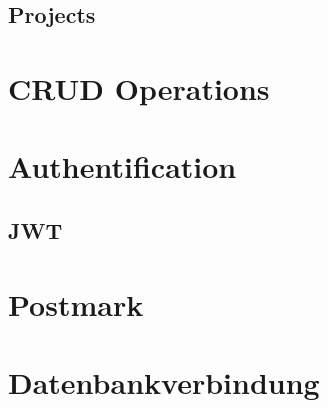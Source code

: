 \subsection{Projects}


\section{CRUD Operations}


\section{Authentification}


\subsection{JWT}


\section{Postmark}


\section{Datenbankverbindung}
